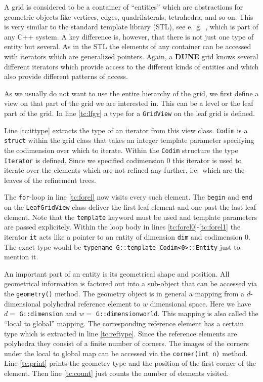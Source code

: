 \documentclass[11pt,a4paper,headinclude,footinclude,DIV16,normalheadings]{scrreprt}
\newcommand{\Dune}{{\sf\bfseries DUNE}\xspace}
\begin{document}
A grid is considered to be a container of ``entities'' which are
abstractions for geometric objects like vertices, edges,
quadrilaterals, tetrahedra, and so on. This is very similar to the
standard template library (STL), see e.~g.~\cite{Stroustrup},
which is part of any C++ system. 
A key difference is, however, that there is not just one type of entity but
several. As in the STL the elements of any container can be accessed
with iterators which are generalized pointers. Again, a \Dune{} grid
knows several different iterators which provide access to the
different kinds of entities and which also provide different patterns
of access.

As we usually do not want to use the entire hierarchy of the grid, we first
define a view on that part of the grid we are interested in. This can be a
level or the leaf part of the grid. In line \ref{tc:lfgv} a type for a
\lstinline!GridView! on the leaf grid is defined.

Line \ref{tc:ittype} extracts the type of an iterator from this view 
class. \lstinline!Codim! is a \lstinline!struct! within the grid class
that takes an integer template parameter specifying the codimension
over which to iterate. Within the \lstinline!Codim! structure the type
\lstinline!Iterator! is defined. Since we specified codimension 0
this iterator is used to iterate
over the elements which are not refined any further, i.e.~which are
the leaves of the refinement trees.

The \lstinline!for!-loop in line \ref{tc:forel} now visits every such
element. The \lstinline!begin! and \lstinline!end! on the
\lstinline!LeafGridView!
class deliver the first leaf element and one past the last leaf element. Note
that the \lstinline!template! keyword must be used and template parameters are
passed explicitely. Within the loop body in
lines \ref{tc:forel0}-\ref{tc:forel1} the iterator \lstinline!it! acts
like a pointer to an entity of dimension \lstinline!dim! and
codimension 0. The exact type would be
\lstinline!typename G::template Codim<0>::Entity! just to mention it.

An important part of an entity is its geometrical shape and position.
All geometrical information is factored out into a sub-object that can
be accessed via the \lstinline!geometry()!  method. The geometry
object is in general a mapping from a $d$-dimensional polyhedral
reference element to $w$ dimensional space. Here we have $d=$
\lstinline!G::dimension! and $w=$ \lstinline!G::dimensionworld!. This
mapping is also called the ``local to global'' mapping.  The
corresponding reference element has a certain type which is extracted
in line \ref{tc:reftype}. Since the reference elements are polyhedra
they consist of a finite number of corners. The images of the corners
under the local to global map can be accessed via the
\lstinline!corner(int n)! method. Line \ref{tc:print} prints the geometry type
and the position of the first corner of the element. Then line
\ref{tc:count} just counts the number of elements visited.
\end{document}
